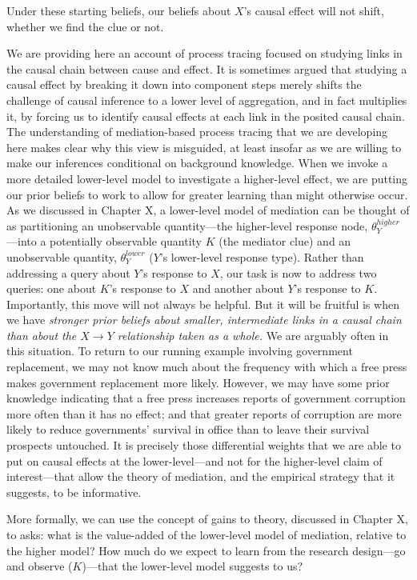 \documentclass[12pt,]{book}
\begin{document}
Under these starting beliefs, our beliefs about \(X\)'s causal effect will not shift, whether we find the clue or not.

We are providing here an account of process tracing focused on studying links in the causal chain between cause and effect. It is sometimes argued that studying a causal effect by breaking it down into component steps merely shifts the challenge of causal inference to a lower level of aggregation, and in fact multiplies it, by forcing us to identify causal effects at each link in the posited causal chain. The understanding of mediation-based process tracing that we are developing here makes clear why this view is misguided, at least insofar as we are willing to make our inferences conditional on background knowledge. When we invoke a more detailed lower-level model to investigate a higher-level effect, we are putting our prior beliefs to work to allow for greater learning than might otherwise occur. As we discussed in Chapter X, a lower-level model of mediation can be thought of as partitioning an unobservable quantity---the higher-level response node, \(\theta_Y^{higher}\)---into a potentially observable quantity \(K\) (the mediator clue) and an unobservable quantity, \(\theta_Y^{lower}\) (\(Y\)'s lower-level response type). Rather than addressing a query about \(Y\)'s response to \(X\), our task is now to address two queries: one about \(K\)'s response to \(X\) and another about \(Y\)'s response to \(K\). Importantly, this move will not always be helpful. But it will be fruitful is when we have \emph{stronger prior beliefs about smaller, intermediate links in a causal chain than about the \(X \rightarrow Y\) relationship taken as a whole.} We are arguably often in this situation. To return to our running example involving government replacement, we may not know much about the frequency with which a free press makes government replacement more likely. However, we may have some prior knowledge indicating that a free press increases reports of government corruption more often than it has no effect; and that greater reports of corruption are more likely to reduce governments' survival in office than to leave their survival prospects untouched. It is precisely those differential weights that we are able to put on causal effects at the lower-level---and not for the higher-level claim of interest---that allow the theory of mediation, and the empirical strategy that it suggests, to be informative.

More formally, we can use the concept of gains to theory, discussed in Chapter X, to asks: what is the value-added of the lower-level model of mediation, relative to the higher model? How much do we expect to learn from the research design---go and observe (\(K\))---that the lower-level model suggests to us?
\end{document}
